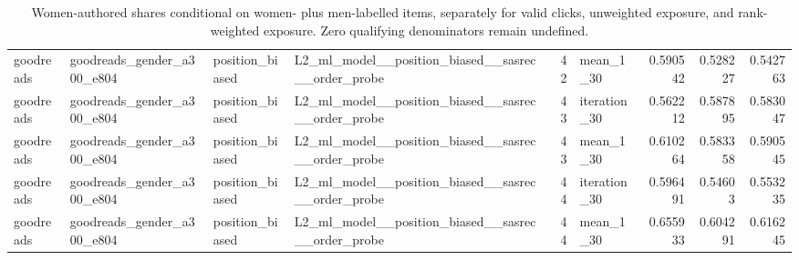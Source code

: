 \begin{table}[htbp!]
\begin{tabular}{llllrlrrr}
goodreads & goodreads\_gender\_a300\_e804 & position\_biased & L2\_ml\_model\_\_position\_biased\_\_sasrec\_\_order\_probe & 42 & mean\_1\_30 & 0.590542 & 0.528227 & 0.542763 \\
goodreads & goodreads\_gender\_a300\_e804 & position\_biased & L2\_ml\_model\_\_position\_biased\_\_sasrec\_\_order\_probe & 43 & iteration\_30 & 0.562212 & 0.587895 & 0.583047 \\
goodreads & goodreads\_gender\_a300\_e804 & position\_biased & L2\_ml\_model\_\_position\_biased\_\_sasrec\_\_order\_probe & 43 & mean\_1\_30 & 0.610264 & 0.583358 & 0.590545 \\
goodreads & goodreads\_gender\_a300\_e804 & position\_biased & L2\_ml\_model\_\_position\_biased\_\_sasrec\_\_order\_probe & 44 & iteration\_30 & 0.596491 & 0.54603 & 0.553235 \\
goodreads & goodreads\_gender\_a300\_e804 & position\_biased & L2\_ml\_model\_\_position\_biased\_\_sasrec\_\_order\_probe & 44 & mean\_1\_30 & 0.655933 & 0.604291 & 0.616245 \\
\hline
\end{tabular}
\caption{Women-authored shares conditional on women- plus men-labelled items, separately for valid clicks, unweighted exposure, and rank-weighted exposure. Zero qualifying denominators remain undefined.}
\label{chap:results:tab:rq7_women_men_gender_summaries}
\end{table}
